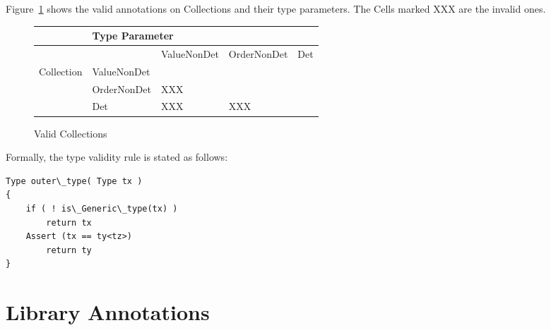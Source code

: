 Figure~\ref{fig-nondeterminism-valid-types} shows the valid annotations on Collections and their type parameters. 
The Cells marked XXX are the invalid ones.
\begin{figure}
	\centering
	\begin{tabular}{|l|l|l|l|l|}
		\hline
		& 		\multicolumn{4}{l|}{Type Parameter}		                                                                   \\ \hline
		&             & ValueNonDet                                     & OrderNonDet              & Det \\ \cline{2-5} 
		Collection    & ValueNonDet &                                                 &                          &     \\ \cline{2-5} 
		& OrderNonDet &   XXX  &                          &     \\ \cline{2-5} 
		& Det         &         XXX               &  	XXX	&     \\ \hline
	\end{tabular}
	\caption{Valid Collections}
	\label{fig-nondeterminism-valid-types}
\end{figure}

Formally, the type validity rule is stated as follows:

\begin{prooftree}
\end{prooftree}

\begin{verbatim}
Type outer\_type( Type tx )
{
    if ( ! is\_Generic\_type(tx) )
        return tx
    Assert (tx == ty<tz>)
        return ty
}
\end{verbatim}

\section{Library Annotations\label{nondeterminism-library-annotations}}
